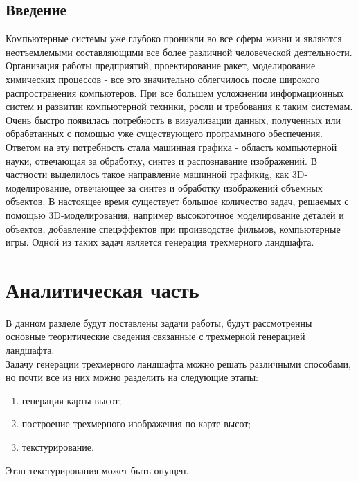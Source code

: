 \documentclass{article}
\begin{document}
	
	\newpage
	\tableofcontents
	\newpage
	\begin{center}
	    \section*{Введение}
	\end{center}
	\indent \indent Компьютерные системы уже глубоко проникли во все сферы жизни и являются неотъемлемыми составляющими все более различной человеческой деятельности. Организация работы предприятий, проектирование ракет, моделирование химических процессов - все это значительно облегчилось после широкого распространения компьютеров.
		\newline
	\indent При все большем усложнении информационных систем и развитии компьютерной техники, росли и требования к таким системам. Очень быстро появилась потребность в визуализации данных, полученных или обрабатанных с помощью уже существующего программного обеспечения. Ответом на эту потребность стала машинная графика - область компьютерной науки, отвечающая за обработку, синтез и распознавание изображений. В частности выделилось такое направление машинной графикиg, как 3D-моделирование, отвечающее за синтез и обработку изображений объемных объектов.
\newline
	\indent В настоящее время существует большое количество задач, решаемых с помощью 3D-моделирования, например высокоточное моделирование деталей и объектов, добавление спецэффектов при производстве фильмов, компьютерные игры. Одной из таких задач является генерация трехмерного ландшафта.
		
	\newpage
	\section{Аналитическая часть}
	В данном разделе будут поставлены задачи работы, будут рассмотренны основные теоритические сведения связанные с трехмерной генерацией ландшафта.
	\\ \indent
	Задачу генерации трехмерного ландшафта можно решать различными способами, но почти все из них можно разделить на следующие этапы:
	\begin{enumerate}
		\item генерация карты высот;
		\item построение трехмерного изображения по карте высот;
		\item текстурирование.
	\end{enumerate}
	Этап текстурирования может быть опущен.
\end{document}
